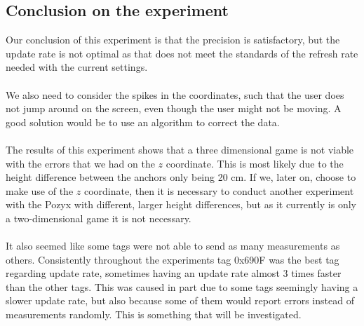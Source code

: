 \subsection{Conclusion on the experiment}
Our conclusion of this experiment is that the precision is satisfactory, but the update rate is not optimal as that does not meet the standards of the refresh rate needed with the current settings.
\\\\
We also need to consider the spikes in the coordinates, such that the user does not jump around on the screen, even though the user might not be moving.
A good solution would be to use an algorithm to correct the data.
\\\\
The results of this experiment shows that a three dimensional game is not viable with the errors that we had on the $z$ coordinate.
This is most likely due to the height difference between the anchors only being 20 cm.
If we, later on, choose to make use of the $z$ coordinate, then it is necessary to conduct another experiment with the Pozyx with different, larger height differences, but as it currently is only a two-dimensional game it is not necessary.
\\\\
It also seemed like some tags were not able to send as many measurements as others.
Consistently throughout the experiments tag 0x690F was the best tag regarding update rate, sometimes having an update rate almost 3 times faster than the other tags.
This was caused in part due to some tags seemingly having a slower update rate, but also because some of them would report errors instead of measurements randomly.
This is something that will be investigated.
